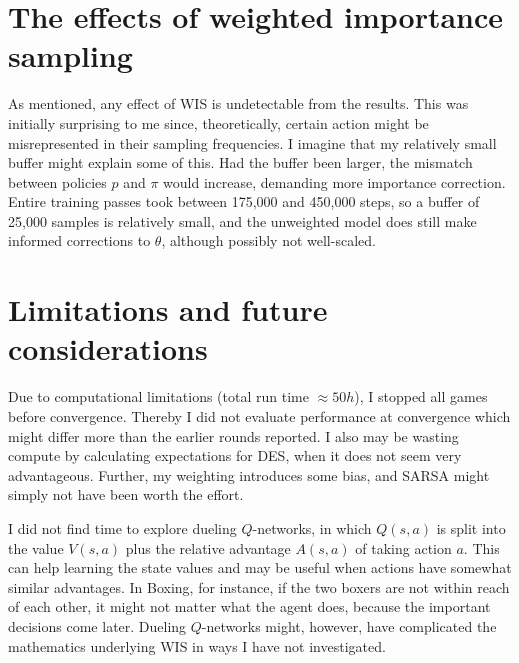 \documentclass{article}
\begin{document}
\section{The effects of weighted importance sampling}
As mentioned, any effect of WIS is undetectable from the results. This was initially surprising to me since, theoretically, certain action might be misrepresented in their sampling frequencies. I imagine that my relatively small buffer might explain some of this. Had the buffer been larger, the mismatch between policies \(p\) and \(\pi\) would increase, demanding more importance correction. Entire training passes took between 175,000 and 450,000 steps, so a buffer of 25,000 samples is relatively small, and the unweighted model does still make informed corrections to \(\theta\), although possibly not well-scaled.

\section{Limitations and future considerations}
Due to computational limitations (total run time \(\approx50h\)), I stopped all games before convergence. Thereby I did not evaluate performance at convergence which might differ more than the earlier rounds reported. I also may be wasting compute by calculating expectations for DES, when it does not seem very advantageous. Further, my weighting introduces some bias, and SARSA might simply not have been worth the effort.

I did not find time to explore dueling \(Q\)-networks, in which \(Q(s,a)\) is split into the value \(V(s,a)\) plus the relative advantage \(A(s,a)\) of taking action \(a\). This can help learning the state values and may be useful when actions have somewhat similar advantages. In Boxing, for instance, if the two boxers are not within reach of each other, it might not matter what the agent does, because the important decisions come later. Dueling \(Q\)-networks might, however, have complicated the mathematics underlying WIS in ways I have not investigated.
\end{document}
